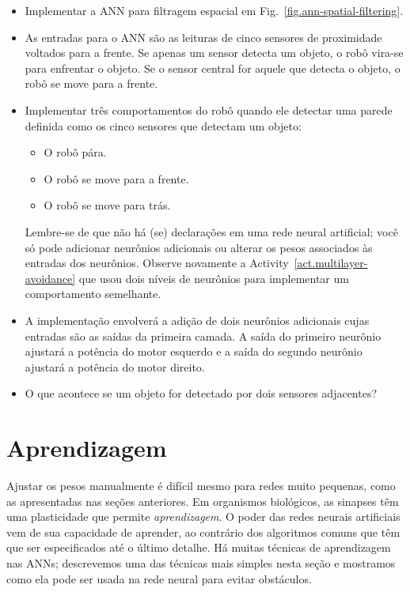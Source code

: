 \begin{framed}
\begin{itemize}
\item Implementar a ANN para filtragem espacial em Fig.~\ref{fig.ann-spatial-filtering}.
\item As entradas para o ANN são as leituras de cinco sensores de proximidade voltados para a frente. Se apenas um sensor detecta um objeto, o robô vira-se para enfrentar o objeto. Se o sensor central for aquele que detecta o objeto, o robô se move para a frente. 
\item Implementar três comportamentos do robô quando ele detectar uma parede definida como os cinco sensores que detectam um objeto:
\begin{itemize}
\item O robô pára.
\item O robô se move para a frente.
\item O robô se move para trás.
\end{itemize}
Lembre-se de que não há \p(se) declarações em uma rede neural artificial; você só pode adicionar neurônios adicionais ou alterar os pesos associados às entradas dos neurônios. Observe novamente a Activity~\ref{act.multilayer-avoidance} que usou dois níveis de neurônios para implementar um comportamento semelhante.
\item A implementação envolverá a adição de dois neurônios adicionais cujas entradas são as saídas da primeira camada. A saída do primeiro neurônio ajustará a potência do motor esquerdo e a saída do segundo neurônio ajustará a potência do motor direito.
\item O que acontece se um objeto for detectado por dois sensores adjacentes?
\end{itemize}
\end{framed}

\section{Aprendizagem}\label{s.ann-learning}

Ajustar os pesos manualmente é difícil mesmo para redes muito pequenas, como as apresentadas nas seções anteriores. Em organismos biológicos, as sinapses têm uma plasticidade que permite \emph{aprendizagem}. O poder das redes neurais artificiais vem de sua capacidade de aprender, ao contrário dos algoritmos comuns que têm que ser especificados até o último detalhe. Há muitas técnicas de aprendizagem nas ANNs; descrevemos uma das técnicas mais simples nesta seção e mostramos como ela pode ser usada na rede neural para evitar obstáculos.

